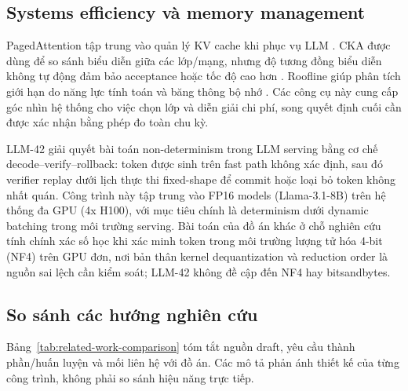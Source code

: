 \subsection{Systems efficiency và memory management}
PagedAttention tập trung vào quản lý KV cache khi phục vụ LLM \cite{kwon2023pagedattention}. CKA được dùng để so sánh biểu diễn giữa các lớp/mạng, nhưng độ tương đồng biểu diễn không tự động đảm bảo acceptance hoặc tốc độ cao hơn \cite{kornblith2019similarity}. Roofline giúp phân tích giới hạn do năng lực tính toán và băng thông bộ nhớ \cite{williams2009roofline}. Các công cụ này cung cấp góc nhìn hệ thống cho việc chọn lớp và diễn giải chi phí, song quyết định cuối cần được xác nhận bằng phép đo toàn chu kỳ.

LLM-42 \cite{gond2026llm42} giải quyết bài toán non-determinism trong LLM serving bằng cơ chế decode--verify--rollback: token được sinh trên fast path không xác định, sau đó verifier replay dưới lịch thực thi fixed-shape để commit hoặc loại bỏ token không nhất quán. Công trình này tập trung vào FP16 models (Llama-3.1-8B) trên hệ thống đa GPU (4x H100), với mục tiêu chính là determinism dưới dynamic batching trong môi trường serving. Bài toán của đồ án khác ở chỗ nghiên cứu tính chính xác số học khi xác minh token trong môi trường lượng tử hóa 4-bit (NF4) trên GPU đơn, nơi bản thân kernel dequantization và reduction order là nguồn sai lệch cần kiểm soát; LLM-42 không đề cập đến NF4 hay bitsandbytes.

\subsection{So sánh các hướng nghiên cứu}
Bảng~\ref{tab:related-work-comparison} tóm tắt nguồn draft, yêu cầu thành phần/huấn luyện và mối liên hệ với đồ án. Các mô tả phản ánh thiết kế của từng công trình, không phải so sánh hiệu năng trực tiếp.

